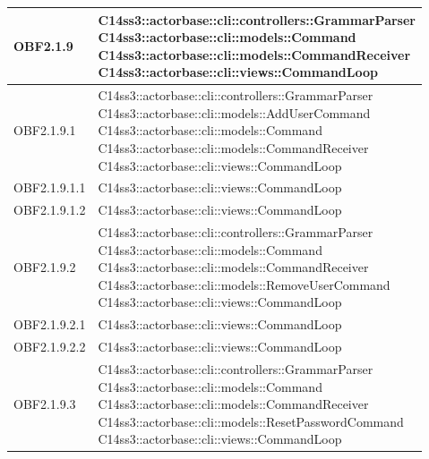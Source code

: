 \documentclass{scalatekids-article}
\begin{document}
\begin{longtable}[H]{|p{4.5cm}|p{13cm}|}
\hline
OBF2.1.9 & \multiLineCell[t]{C14ss3::actorbase::cli::controllers::GrammarParser\\C14ss3::actorbase::cli::models::Command\\C14ss3::actorbase::cli::models::CommandReceiver\\C14ss3::actorbase::cli::views::CommandLoop\\}\\
\hline
OBF2.1.9.1 & \multiLineCell[t]{C14ss3::actorbase::cli::controllers::GrammarParser\\C14ss3::actorbase::cli::models::AddUserCommand\\C14ss3::actorbase::cli::models::Command\\C14ss3::actorbase::cli::models::CommandReceiver\\C14ss3::actorbase::cli::views::CommandLoop\\}\\
\hline
OBF2.1.9.1.1 & \multiLineCell[t]{C14ss3::actorbase::cli::views::CommandLoop\\}\\
\hline
OBF2.1.9.1.2 & \multiLineCell[t]{C14ss3::actorbase::cli::views::CommandLoop\\}\\
\hline
OBF2.1.9.2 & \multiLineCell[t]{C14ss3::actorbase::cli::controllers::GrammarParser\\C14ss3::actorbase::cli::models::Command\\C14ss3::actorbase::cli::models::CommandReceiver\\C14ss3::actorbase::cli::models::RemoveUserCommand\\C14ss3::actorbase::cli::views::CommandLoop\\}\\
\hline
OBF2.1.9.2.1 & \multiLineCell[t]{C14ss3::actorbase::cli::views::CommandLoop\\}\\
\hline
OBF2.1.9.2.2 & \multiLineCell[t]{C14ss3::actorbase::cli::views::CommandLoop\\}\\
\hline
OBF2.1.9.3 & \multiLineCell[t]{C14ss3::actorbase::cli::controllers::GrammarParser\\C14ss3::actorbase::cli::models::Command\\C14ss3::actorbase::cli::models::CommandReceiver\\C14ss3::actorbase::cli::models::ResetPasswordCommand\\C14ss3::actorbase::cli::views::CommandLoop\\}\\

\end{longtable}
\end{document}
